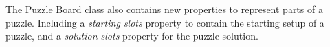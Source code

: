 \documentclass{l4proj}
\begin{document}
The Puzzle Board class also contains new properties to represent parts of a puzzle. Including a \emph{starting slots} property to contain the starting setup of a puzzle, and a \emph{solution slots} property for the puzzle solution.





\end{document}
